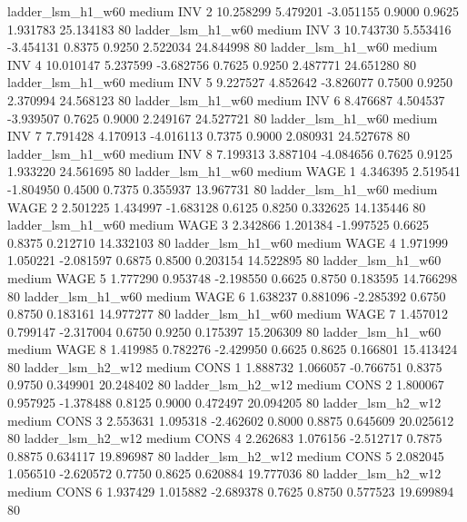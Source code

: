      ladder_lsm_h1_w60     medium      INV                 2 10.258299 5.479201 -3.051155 0.9000 0.9625  1.931783   25.134183 80
     ladder_lsm_h1_w60     medium      INV                 3 10.743730 5.553416 -3.454131 0.8375 0.9250  2.522034   24.844998 80
     ladder_lsm_h1_w60     medium      INV                 4 10.010147 5.237599 -3.682756 0.7625 0.9250  2.487771   24.651280 80
     ladder_lsm_h1_w60     medium      INV                 5  9.227527 4.852642 -3.826077 0.7500 0.9250  2.370994   24.568123 80
     ladder_lsm_h1_w60     medium      INV                 6  8.476687 4.504537 -3.939507 0.7625 0.9000  2.249167   24.527721 80
     ladder_lsm_h1_w60     medium      INV                 7  7.791428 4.170913 -4.016113 0.7375 0.9000  2.080931   24.527678 80
     ladder_lsm_h1_w60     medium      INV                 8  7.199313 3.887104 -4.084656 0.7625 0.9125  1.933220   24.561695 80
     ladder_lsm_h1_w60     medium     WAGE                 1  4.346395 2.519541 -1.804950 0.4500 0.7375  0.355937   13.967731 80
     ladder_lsm_h1_w60     medium     WAGE                 2  2.501225 1.434997 -1.683128 0.6125 0.8250  0.332625   14.135446 80
     ladder_lsm_h1_w60     medium     WAGE                 3  2.342866 1.201384 -1.997525 0.6625 0.8375  0.212710   14.332103 80
     ladder_lsm_h1_w60     medium     WAGE                 4  1.971999 1.050221 -2.081597 0.6875 0.8500  0.203154   14.522895 80
     ladder_lsm_h1_w60     medium     WAGE                 5  1.777290 0.953748 -2.198550 0.6625 0.8750  0.183595   14.766298 80
     ladder_lsm_h1_w60     medium     WAGE                 6  1.638237 0.881096 -2.285392 0.6750 0.8750  0.183161   14.977277 80
     ladder_lsm_h1_w60     medium     WAGE                 7  1.457012 0.799147 -2.317004 0.6750 0.9250  0.175397   15.206309 80
     ladder_lsm_h1_w60     medium     WAGE                 8  1.419985 0.782276 -2.429950 0.6625 0.8625  0.166801   15.413424 80
     ladder_lsm_h2_w12     medium     CONS                 1  1.888732 1.066057 -0.766751 0.8375 0.9750  0.349901   20.248402 80
     ladder_lsm_h2_w12     medium     CONS                 2  1.800067 0.957925 -1.378488 0.8125 0.9000  0.472497   20.094205 80
     ladder_lsm_h2_w12     medium     CONS                 3  2.553631 1.095318 -2.462602 0.8000 0.8875  0.645609   20.025612 80
     ladder_lsm_h2_w12     medium     CONS                 4  2.262683 1.076156 -2.512717 0.7875 0.8875  0.634117   19.896987 80
     ladder_lsm_h2_w12     medium     CONS                 5  2.082045 1.056510 -2.620572 0.7750 0.8625  0.620884   19.777036 80
     ladder_lsm_h2_w12     medium     CONS                 6  1.937429 1.015882 -2.689378 0.7625 0.8750  0.577523   19.699894 80
